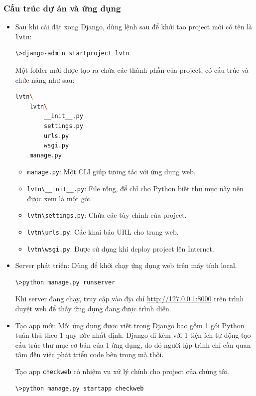 \subsubsection{Cấu trúc dự án và ứng dụng}
\begin{itemize}
	\item Sau khi cài đặt xong Django, dùng lệnh sau để khởi tạo project mới có tên là \texttt{lvtn}:
	\begin{lstlisting}[language=bash]
\>django-admin startproject lvtn
	\end{lstlisting}
	Một folder mới được tạo ra chứa các thành phần của project, có cấu trúc và chức năng như sau:
	\begin{lstlisting}[language=bash]
lvtn\
	lvtn\
		__init__.py
		settings.py
		urls.py
		wsgi.py
	manage.py
	\end{lstlisting}
	\begin{itemize}
		\item \texttt{manage.py}: Một CLI giúp tương tác với ứng dụng web.
		\item \texttt{lvtn\textbackslash\_\_init\_\_.py}: File rỗng, để chỉ cho Python biết thư mục này nên được xem là một gói.
		\item \texttt{lvtn\textbackslash settings.py}: Chứa các tùy chỉnh của project.
		\item \texttt{lvtn\textbackslash urls.py}: Các khai báo URL cho trang web.
		\item \texttt{lvtn\textbackslash wsgi.py}: Được sử dụng khi deploy project lên Internet.
	\end{itemize}
	\item Server phát triển: Dùng để khởi chạy ứng dụng web trên máy tính local.
	\begin{lstlisting}[language=bash]
\>python manage.py runserver
	\end{lstlisting}
	Khi server đang chạy, truy cập vào địa chỉ \url{http://127.0.0.1:8000} trên trình duyệt web để thấy ứng dụng đang được trình diễn.
	\item Tạo app mới: Mỗi ứng dụng được viết trong Django bao gồm 1 gói Python tuân thủ theo 1 quy ước nhất định. Django đi kèm với 1 tiện ích tự động tạo cấu trúc thư mục cơ bản của 1 ứng dụng, do đó người lập trình chỉ cần quan tâm đến việc phát triển code bên trong mà thôi.
	\par
	Tạo app \texttt{checkweb}	có nhiệm vụ xử lý chính cho project của chúng tôi.
	\begin{lstlisting}[language=bash]
\>python manage.py startapp checkweb
	\end{lstlisting}

\end{itemize}
